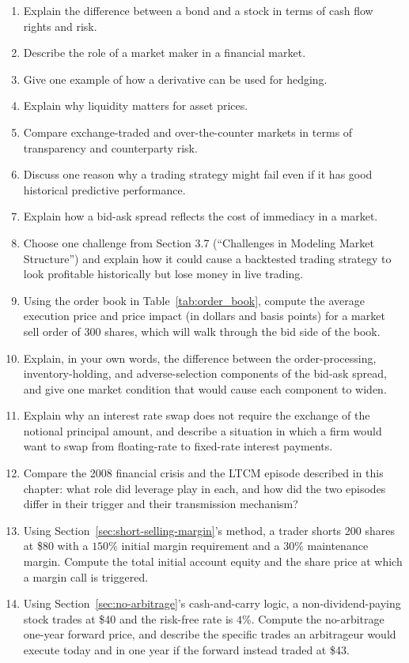 \documentclass[../ai_in_finance]{subfiles}
\begin{document}
\begin{enumerate}
    \item Explain the difference between a bond and a stock in terms of cash flow rights and risk.
    \item Describe the role of a market maker in a financial market.
    \item Give one example of how a derivative can be used for hedging.
    \item Explain why liquidity matters for asset prices.
    \item Compare exchange-traded and over-the-counter markets in terms of transparency and counterparty risk.
    \item Discuss one reason why a trading strategy might fail even if it has good historical predictive performance.
    \item Explain how a bid-ask spread reflects the cost of immediacy in a market.
    \item Choose one challenge from Section 3.7 (``Challenges in Modeling Market Structure'') and explain how it could cause a backtested trading strategy to look profitable historically but lose money in live trading.
    \item Using the order book in Table~\ref{tab:order_book}, compute the average execution price and price impact (in dollars and basis points) for a market sell order of 300 shares, which will walk through the bid side of the book.
    \item Explain, in your own words, the difference between the order-processing, inventory-holding, and adverse-selection components of the bid-ask spread, and give one market condition that would cause each component to widen.
    \item Explain why an interest rate swap does not require the exchange of the notional principal amount, and describe a situation in which a firm would want to swap from floating-rate to fixed-rate interest payments.
    \item Compare the 2008 financial crisis and the LTCM episode described in this chapter: what role did leverage play in each, and how did the two episodes differ in their trigger and their transmission mechanism?
    \item Using Section~\ref{sec:short-selling-margin}'s method, a trader shorts 200 shares at \$80 with a $150\%$ initial margin requirement and a $30\%$ maintenance margin. Compute the total initial account equity and the share price at which a margin call is triggered.
    \item Using Section~\ref{sec:no-arbitrage}'s cash-and-carry logic, a non-dividend-paying stock trades at \$40 and the risk-free rate is $4\%$. Compute the no-arbitrage one-year forward price, and describe the specific trades an arbitrageur would execute today and in one year if the forward instead traded at \$43.

\end{enumerate}
\end{document}
